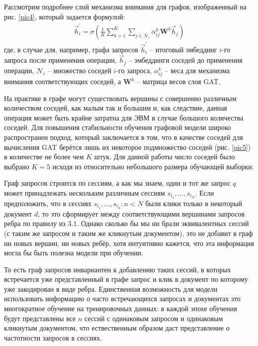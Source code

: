 \documentclass[diploma]{nanolab2015}
\begin{document}
Рассмотрим подробнее слой механизма внимания для графов, изображенный на рис. \ref{pic4}, который задается формулой:
\begin{align}
    \vec{h}^{'}_i = \sigma \left( \frac{1}{K} \sum_{k=1}^K \sum_{j \in \mathcal{N}_i} \alpha_{ij}^k \mathbf{W}^k\vec{h}_j \right) \label{gat}
\end{align}
где, в случае для, например, графа запросов $\vec{h}_i^{'}$ -- итоговый эмбеддинг $i$-го запроса после применения операции, $\vec{h}_j$ -- эмбеддинги соседей до применения операции, $\mathcal{N}_i$ -- множество соседей $i$-го запроса, $\alpha_{ij}^k$ -- веса для механизма внимания соответствующих соседей, а $\mathbf{W}^k$ -- матрица весов слоя GAT.

На практике в графе могут существовать вершины с совершенно различным количеством соседей, как малым так и большим и, как следствие, данная операция может быть крайне затратна для ЭВМ в случае большого количества соседей. Для повышения стабильности обучения графовой модели широко распространен подход, который заключается в том, что в качестве соседей для вычисления GAT берётся лишь их некоторое подмножество соседей (рис. \ref{pic5}) в количестве не более чем $K$ штук. Для данной работы число соседей было выбрано $K=5$ исходя из относительно небольшого размера обучающей выборки.

Граф запросов строится по сессиям, а как мы знаем, один и тот же запрос $q$ может принадлежать нескольким различным сессиям ${s_{i_1}, \dots , s_{i_N}}$. Если предположить, что в сессиях $s_{i_1}, \dots , s_{i_n} : n < N$ были клики только в некоторый документ $d$, то это сформирует между соответствующими вершинами запросов ребра по правилу из 3.1. Однако сколько бы мы ни брали эквивалентных сессий (с таким же запросом и таким же кликнутым документом), это не добавит в граф ни новых вершин, ни новых ребёр, хотя интуитивно кажется, что эта информация могла бы быть полезна модели при обучении.

То есть граф запросов инвариантен к добавлению таких сессий, в которых встречается уже представленный в графе запрос и клик в документ по которому уже закодирован в виде ребра. Единственная возможность для модели использовать информацию о часто встречающихся запросах и документах это многократное обучение на тренировочных данных: в каждой эпохе обучения будут представлены все $n$ сессий с одинаковым запросом и одинаковым кликнутым документом, что ествественным образом даст представление о частотности запросов в сессиях.
\end{document}
